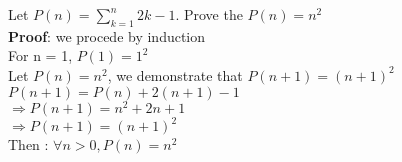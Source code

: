 \documentclass{article}
\begin{document}
\noindent Let $P(n) = \sum_{k=1}^{n}{2k - 1}$. Prove the $P(n) = n^2$\\
\noindent \textbf{Proof}: we procede by induction\\
For n = 1, $P(1) = 1^2$\\
Let $P(n) = n^2$, we demonstrate that $P(n + 1) = (n + 1)^2$\\
$P(n + 1) = P(n) + 2(n + 1) - 1$\\
$\Rightarrow P(n + 1) = n^2 + 2n + 1$\\
$\Rightarrow P(n + 1) = (n + 1)^2$\\
Then : $\forall n > 0, P(n) = n^2$\\
\end{document}
